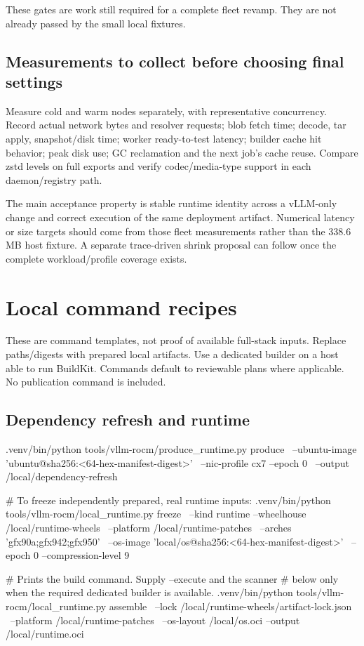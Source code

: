 \documentclass[11pt,a4paper]{article}
\newcommand{\term}[1]{\texttt{\detokenize{#1}}}
\begin{document}
These gates are work still required for a complete fleet revamp. They are not
already passed by the small local fixtures.

\subsection{Measurements to collect before choosing final settings}

Measure cold and warm nodes separately, with representative concurrency. Record
actual network bytes and resolver requests; blob fetch time; decode, tar apply,
snapshot/disk time; worker ready-to-test latency; builder cache hit behavior;
peak disk use; GC reclamation and the next job's cache reuse. Compare zstd levels
on full exports and verify codec/media-type support in each daemon/registry path.

The main acceptance property is stable runtime identity across a vLLM-only
change and correct execution of the same deployment artifact. Numerical latency
or size targets should come from those fleet measurements rather than the
338.6 MB host fixture. A separate trace-driven shrink proposal can follow once
the complete workload/profile coverage exists.

\appendix
\section{Local command recipes}

These are command templates, not proof of available full-stack inputs. Replace
paths/digests with prepared local artifacts. Use a dedicated
\term{vllm-rocm-*} builder on a host able to run BuildKit. Commands default to
reviewable plans where applicable. No publication command is included.

\subsection{Dependency refresh and runtime}

\begin{Code}
.venv/bin/python tools/vllm-rocm/produce_runtime.py produce \
  --ubuntu-image 'ubuntu@sha256:<64-hex-manifest-digest>' \
  --nic-profile cx7 --epoch 0 \
  --output /local/dependency-refresh

# To freeze independently prepared, real runtime inputs:
.venv/bin/python tools/vllm-rocm/local_runtime.py freeze \
  --kind runtime --wheelhouse /local/runtime-wheels \
  --platform /local/runtime-patches \
  --arches 'gfx90a;gfx942;gfx950' \
  --os-image 'local/os@sha256:<64-hex-manifest-digest>' \
  --epoch 0 --compression-level 9

# Prints the build command. Supply --execute and the scanner
# below only when the required dedicated builder is available.
.venv/bin/python tools/vllm-rocm/local_runtime.py assemble \
  --lock /local/runtime-wheels/artifact-lock.json \
  --platform /local/runtime-patches \
  --os-layout /local/os.oci --output /local/runtime.oci
\end{Code}
\end{document}
